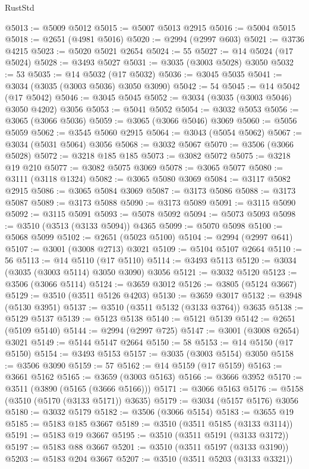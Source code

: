 \begin{lexlean}{RustStd}
\begin{coremodule}
@5013 := @5009 @5012
@5015 := @5007 @5013 @2915
@5016 := @5004 @5015
@5018 := @2651 (@4981 @5016)
@5020 := @2994 (@2997 @603)
@5021 := @3736 @4215
@5023 := @5020 @5021 @2654
@5024 := 55
@5027 := @14 @5024 (@17 @5024)
@5028 := @3493 @5027
@5031 := @3035 (@3003 @5028) @3050
@5032 := 53
@5035 := @14 @5032 (@17 @5032)
@5036 := @3045 @5035
@5041 := @3034 (@3035 (@3003 @5036) @3050 @3090)
@5042 := 54
@5045 := @14 @5042 (@17 @5042)
@5046 := @3045 @5045
@5052 := @3034 (@3035 (@3003 @5046) @3050 @4202) @3056
@5053 := @5041 @5052
@5054 := @3032 @5053
@5056 := @3065 (@3066 @5036)
@5059 := @3065 (@3066 @5046) @3069
@5060 := @5056 @5059
@5062 := @3545 @5060 @2915
@5064 := @3043 (@5054 @5062)
@5067 := @3034 (@5031 @5064) @3056
@5068 := @3032 @5067
@5070 := @3506 (@3066 @5028)
@5072 := @3218 @185 @185
@5073 := @3082 @5072
@5075 := @3218 @19 @210
@5077 := @3082 @5075 @3069
@5078 := @3065 @5077
@5080 := @3111 (@3118 @1324)
@5082 := @3065 @5080 @3069
@5084 := @3117 @5082 @2915
@5086 := @3065 @5084 @3069
@5087 := @3173 @5086
@5088 := @3173 @5087
@5089 := @3173 @5088
@5090 := @3173 @5089
@5091 := @3115 @5090
@5092 := @3115 @5091
@5093 := @5078 @5092
@5094 := @5073 @5093
@5098 := @3510 (@3513 (@3133 @5094)) @4365
@5099 := @5070 @5098
@5100 := @5068 @5099
@5102 := @2651 (@5023 @5100)
@5104 := @2994 (@2997 @641)
@5107 := @3001 (@3008 @2713) @3021
@5109 := @5104 @5107 @2664
@5110 := 56
@5113 := @14 @5110 (@17 @5110)
@5114 := @3493 @5113
@5120 := @3034 (@3035 (@3003 @5114) @3050 @3090) @3056
@5121 := @3032 @5120
@5123 := @3506 (@3066 @5114)
@5124 := @3659 @3012
@5126 := @3805 (@5124 @3667)
@5129 := @3510 (@3511 @5126 @4203)
@5130 := @3659 @3017
@5132 := @3948 (@5130 @3951)
@5137 := @3510 (@3511 @5132 (@3133 @3764)) @3635
@5138 := @5129 @5137
@5139 := @5123 @5138
@5140 := @5121 @5139
@5142 := @2651 (@5109 @5140)
@5144 := @2994 (@2997 @725)
@5147 := @3001 (@3008 @2654) @3021
@5149 := @5144 @5147 @2664
@5150 := 58
@5153 := @14 @5150 (@17 @5150)
@5154 := @3493 @5153
@5157 := @3035 (@3003 @5154) @3050
@5158 := @3506 @3090
@5159 := 57
@5162 := @14 @5159 (@17 @5159)
@5163 := @3661 @5162
@5165 := @3659 (@3003 @5163)
@5166 := @3666 @3952
@5170 := @3511 (@3890 (@5165 (@3666 @5166)))
@5171 := @3066 @5163
@5176 := @5158 (@3510 (@5170 (@3133 @5171)) @3635)
@5179 := @3034 (@5157 @5176) @3056
@5180 := @3032 @5179
@5182 := @3506 (@3066 @5154)
@5183 := @3655 @19
@5185 := @5183 @185 @3667
@5189 := @3510 (@3511 @5185 (@3133 @3114))
@5191 := @5183 @19 @3667
@5195 := @3510 (@3511 @5191 (@3133 @3172))
@5197 := @5183 @88 @3667
@5201 := @3510 (@3511 @5197 (@3133 @3190))
@5203 := @5183 @204 @3667
@5207 := @3510 (@3511 @5203 (@3133 @3321))

\end{coremodule}
\end{lexlean}
